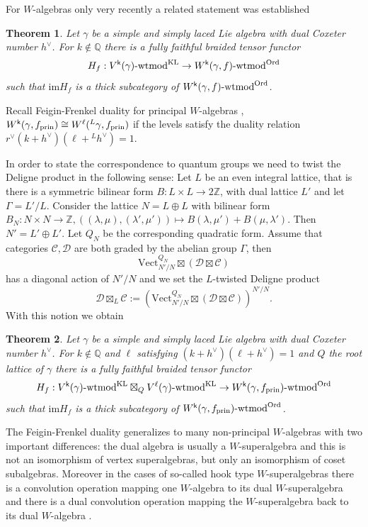 \documentclass[a4paper, reqno]{amsart}
\newtheorem{theorem}{Theorem}[section]
\theoremstyle{introTheorems}
\newcommand\cC{\mathcal{C}}
\newcommand\cD{\mathcal{D}}
\newcommand\g\gamma
\renewcommand{\1}{\mathbbold{1}}
\begin{document}
For $W$-algebras only very recently a related statement was established
\begin{theorem} \cites{CGN}
Let $\g$ be a simple and simply laced Lie algebra with dual Coxeter number $h^\vee$. For $k \notin \mathbb Q$ there is a fully faithful braided tensor functor 
\[
H_f: V^\k(\g)\text{-}\mathrm{wtmod}^{\mathrm{KL}} \rightarrow W^\k(\g, f)\text{-}\mathrm{wtmod}^{\mathrm{Ord}}
\]
such that $\mathrm{im} H_f$ is a thick subcategory of 
$W^\k(\g, f)\text{-}\mathrm{wtmod}^{\mathrm{Ord}}$.
\end{theorem}
Recall Feigin-Frenkel duality for principal $W$-algebras \cite{FF91}, $W^\k(\g, f_{\text{prin}}) \cong W^\ell({}^L\g, f_{\text{prin}})$ if the levels satisfy the duality relation
$r^\vee(k+h^\vee)(\ell + {}^Lh^\vee) =1$.

In order to state the correspondence to quantum groups we need to twist the Deligne product in the following sense:
Let $L$ be an even integral lattice, that is there is a symmetric bilinear form $B:  L \times L \rightarrow 2\mathbb Z$, 
with dual lattice $L'$ and let $\Gamma = L'/L$. 
Consider the lattice $N = L \oplus L$ with bilinear form $B_N: N \times N \rightarrow \mathbb Z, ((\lambda, \mu),(\lambda', \mu')) \mapsto B(\lambda, \mu') + B(\mu, \lambda')$. Then $N' = L' \oplus L'$.
Let $Q_N$ be the corresponding quadratic form. 
Assume that categories $\cC, \cD$ are both graded by the abelian group $\Gamma$, then 
\[
\mathrm{Vect}_{N'/N}^{Q_N} \boxtimes (\cD \boxtimes \cC)
\]
has a diagonal action of $N'/N$ and we set the $L$-twisted Deligne product
\[
\cD \boxtimes_L \cC := \left(\mathrm{Vect}_{N'/N}^{Q_N} \boxtimes (\cD \boxtimes \cC)\right)^{N'/N}.
\]
With this notion we obtain
\begin{theorem} \cites{CGN}
Let $\g$ be a simple and simply laced Lie algebra with dual Coxeter number $h^\vee$. For $k \notin \mathbb Q$ and $\ell$ satisfying $(k+h^\vee)(\ell+h^\vee)=1$ and $Q$ the root lattice of $\g$ there is a fully faithful braided tensor functor 
\[
H_f: V^\k(\g)\text{-}\mathrm{wtmod}^{\mathrm{KL}} \boxtimes_Q V^\ell(\g)\text{-}\mathrm{wtmod}^{\mathrm{KL}} \rightarrow W^\k(\g, f_{\text{prin}})\text{-}\mathrm{wtmod}^{\mathrm{Ord}}
\]
such that $\mathrm{im} H_f$ is a thick subcategory of 
$W^\k(\g, f_{\text{prin}})\text{-}\mathrm{wtmod}^{\mathrm{Ord}}$.
\end{theorem}
The Feigin-Frenkel duality generalizes to many non-principal $W$-algebras \cites{CL1, CL2, CKLSS} with two important differences: the dual algebra is usually a $W$-superalgebra and this is not an isomorphism of vertex superalgebras, but only an isomorphism of coset subalgebras. Moreover in the cases of so-called hook type $W$-superalgebras \cites{CL1, CL2} there is a convolution operation mapping one $W$-algebra to its dual $W$-superalgebra and there is a dual convolution operation mapping the $W$-superalgebra back to its dual $W$-algebra \cite{CLNS}. 
\end{document}
